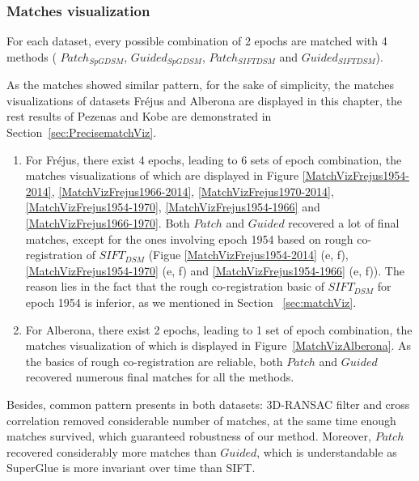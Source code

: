 \subsubsection{Matches visualization}
\label{matchVizMainBody}
For each dataset, every possible combination of 2 epochs are matched with 4 methods ( $Patch_{SpGDSM}$,  $Guided_{SpGDSM}$,  $Patch_{SIFTDSM}$ and  $Guided_{SIFTDSM}$). 

As the matches showed similar pattern, for the sake of simplicity, the matches visualizations of datasets Fr{\'e}jus and Alberona are displayed in this chapter, the rest results of Pezenas and Kobe are demonstrated in Section~\ref{sec:PrecisematchViz}.\\

\begin{enumerate}
	\item For Fr{\'e}jus, there exist 4 epochs, leading to 6 sets of epoch combination, the matches visualizations of which are displayed in Figure \ref{MatchVizFrejus1954-2014}, \ref{MatchVizFrejus1966-2014}, \ref{MatchVizFrejus1970-2014}, \ref{MatchVizFrejus1954-1970}, \ref{MatchVizFrejus1954-1966} and \ref{MatchVizFrejus1966-1970}. Both $Patch$ and $Guided$ recovered a lot of final matches, except for the ones involving epoch 1954 based on rough co-registration of $SIFT_{DSM}$ (Figue \ref{MatchVizFrejus1954-2014} (e, f), \ref{MatchVizFrejus1954-1970} (e, f) and \ref{MatchVizFrejus1954-1966} (e, f)). The reason lies in the fact that the rough co-registration basic of $SIFT_{DSM}$ for epoch 1954 is inferior, as we mentioned in Section ~\ref{sec:matchViz}.

	\item For Alberona, there exist 2 epochs, leading to 1 set of epoch combination, the matches visualization of which is displayed in Figure~\ref{MatchVizAlberona}. As the basics of rough co-registration are reliable, both $Patch$ and $Guided$ recovered numerous final matches for all the methods.
\end{enumerate}

Besides, common pattern presents in both datasets: 3D-RANSAC filter and cross correlation removed considerable number of matches, at the same time enough matches survived, which guaranteed robustness of our method. Moreover, $Patch$ recovered considerably more matches than $Guided$, which is understandable as SuperGlue is more invariant over time than SIFT.\\

